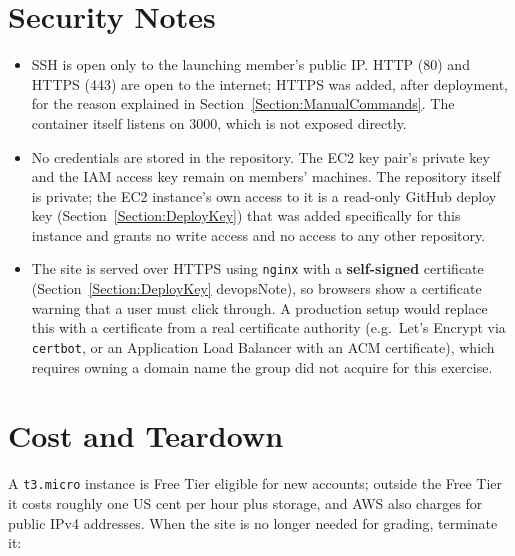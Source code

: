 \section{Security Notes}
\begin{itemize}
\item SSH is open only to the launching member's public IP. HTTP (80) and
HTTPS (443) are open to the internet; HTTPS was added, after deployment, for
the reason explained in Section~\ref{Section:ManualCommands}. The container
itself listens on 3000, which is not exposed directly.
\item No credentials are stored in the repository. The EC2 key pair's private
key and the IAM access key remain on members' machines. The repository itself
is private; the EC2 instance's own access to it is a read-only GitHub deploy
key (Section~\ref{Section:DeployKey}) that was added specifically for this
instance and grants no write access and no access to any other repository.
\item The site is served over HTTPS using \texttt{nginx} with a
\textbf{self-signed} certificate (Section~\ref{Section:DeployKey}
devopsNote), so browsers show a certificate warning that a user must click
through. A production setup would replace this with a certificate from a
real certificate authority (e.g.\ Let's Encrypt via \texttt{certbot}, or an
Application Load Balancer with an ACM certificate), which requires owning a
domain name the group did not acquire for this exercise.
\end{itemize}

\section{Cost and Teardown}
A \texttt{t3.micro} instance is Free Tier eligible for new accounts; outside
the Free Tier it costs roughly one US cent per hour plus storage, and AWS also
charges for public IPv4 addresses. When the site is no longer needed for
grading, terminate it:
\inputminted{bash}{../deploy/aws/teardown-ec2.sh}

